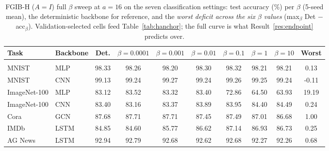 \begin{table}[t]
\caption{FGIB-H ($A{=}I$) full $\beta$ sweep at $a{=}16$ on the seven classification settings: test accuracy (\%) per $\beta$ (5-seed mean), the deterministic backbone for reference, and the \emph{worst deficit across the six $\beta$ values} (max$_\beta$ Det $-$ acc$_\beta$). Validation-selected cells feed Table~\ref{tab:hanchor}; the full curve is what Result~\ref{res:endpoint} predicts over.}
\label{tab:hanchor-sweep-a16}
\begin{center}\footnotesize
\begin{tabular}{llcccccccc}
Task & Backbone & Det. & $\beta=0.0001$ & $\beta=0.001$ & $\beta=0.01$ & $\beta=0.1$ & $\beta=1$ & $\beta=10$ & Worst \\ \hline \\[-1.8ex]
MNIST & MLP & 98.33 & 98.26 & 98.20 & 98.30 & 98.32 & 98.21 & 98.21 & 0.13 \\
MNIST & CNN & 99.13 & 99.24 & 99.27 & 99.24 & 99.26 & 99.25 & 99.24 & -0.11 \\
ImageNet-100 & MLP & 83.12 & 83.52 & 83.32 & 83.40 & 72.86 & 64.50 & 63.93 & 19.19 \\
ImageNet-100 & CNN & 83.40 & 83.16 & 83.37 & 83.89 & 83.95 & 84.40 & 84.49 & 0.24 \\
Cora & GCN & 87.68 & 87.71 & 87.71 & 87.45 & 87.49 & 87.01 & 86.68 & 1.00 \\
IMDb & LSTM & 84.85 & 84.60 & 85.77 & 86.62 & 87.14 & 86.93 & 86.73 & 0.25 \\
AG News & LSTM & 92.94 & 92.79 & 92.68 & 92.62 & 92.68 & 92.27 & 92.26 & 0.68 \\
\end{tabular}\end{center}\end{table}

